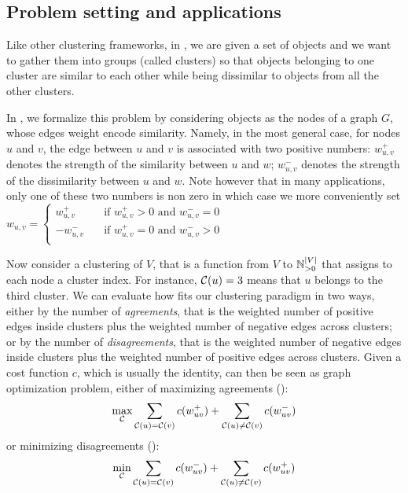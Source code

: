 \subsection{Problem setting and applications}
\label{sub:problem_setting}


Like other clustering frameworks, in \pcc{}, we are given a set of objects and we want to gather
them into groups (called clusters) so that objects belonging to one cluster are similar to each
other while being dissimilar to objects from all the other clusters.

In \pcc{}, we formalize this problem by considering objects as the nodes of a graph $G$, whose edges
weight encode similarity. Namely, in the most general case, for nodes $u$ and $v$, the edge between
$u$ and $v$ is associated with two positive numbers:
$w_{u,v}^+$ denotes the strength of the similarity between $u$ and $w$;
$w_{u,v}^-$ denotes the strength of the dissimilarity between $u$ and $w$.
Note however that in many applications, only one of these two numbers is non zero in which case we
more conveniently set $w_{u,v} = \begin{cases}
	 w_{u,v}^+ & \quad \text{if } w_{u,v}^+ > 0 \text{ and } w_{u,v}^-=0 \\
	-w_{u,v}^- & \quad \text{if } w_{u,v}^+ = 0 \text{ and } w_{u,v}^->0 \\
\end{cases}$

Now consider a clustering \cluster{} of $V$, that is a function from $V$ to $\mathbb{N}{}^{|V|}_{>0}$
that assigns to each node a cluster index. For instance, $\mathcal{C}(u) = 3$ means that $u$ belongs
to the third cluster. We can evaluate how \cluster{} fits our clustering paradigm in two ways,
either by the number of \emph{agreements}, that is the weighted number of positive edges inside
clusters plus the weighted number of negative edges across clusters; or by the number of
\emph{disagreements}, that is the weighted number of negative edges inside clusters plus the
weighted number of positive edges across clusters. Given a cost function $c$, which is usually the
identity, \pcc{} can then be seen as graph optimization problem, either of maximizing agreements
(\maxa{}):
\begin{equation}
	\max_{\mathcal{C}{}} \sum_{\mathcal{C}(u) = \mathcal{C}(v)} c(w_{uv}^+) +
	\sum_{\mathcal{C}(u) \neq \mathcal{C}(v)} c(w_{uv}^-)
	\label{eq:maxa}
\end{equation}
or minimizing disagreements (\mind{}):
\begin{equation}
	\min_{\mathcal{C}{}} \sum_{\mathcal{C}(u) = \mathcal{C}(v)} c(w_{uv}^-) +
	\sum_{\mathcal{C}(u) \neq \mathcal{C}(v)} c(w_{uv}^+)
	\label{eq:mind}
\end{equation}

